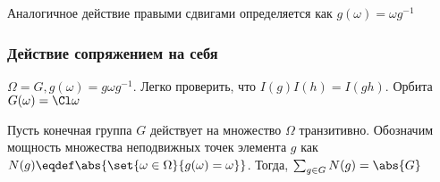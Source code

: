 Аналогичное действие правыми сдвигами определяется как $g(\omega)=\omega g^{-1}$
\subsubsection{Действие сопряжением на себя}
$\Omega=G, g(\omega)=g\omega g^{-1}$. Легко проверить, что $I(g)I(h)=I(gh)$. Орбита $G(\omega)=\Cl\omega$


\begin{theorem}
  Пусть конечная группа $G$ действует на множество $\Omega$ транзитивно.
  Обозначим мощность множества неподвижных точек элемента $g$ как $N(g)\eqdef\abs{\set{\omega\in\Omega}{g(\omega)=\omega}}$. Тогда, $\sum_{g\in G}{N(g)} =\abs{G}$
\end{theorem}
